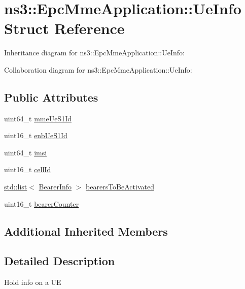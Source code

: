 \hypertarget{structns3_1_1EpcMmeApplication_1_1UeInfo}{}\section{ns3\+:\+:Epc\+Mme\+Application\+:\+:Ue\+Info Struct Reference}
\label{structns3_1_1EpcMmeApplication_1_1UeInfo}


Inheritance diagram for ns3\+:\+:Epc\+Mme\+Application\+:\+:Ue\+Info\+:


Collaboration diagram for ns3\+:\+:Epc\+Mme\+Application\+:\+:Ue\+Info\+:
\subsection*{Public Attributes}
\begin{DoxyCompactItemize}
\item 
uint64\+\_\+t \hyperlink{structns3_1_1EpcMmeApplication_1_1UeInfo_a310f7a7e997ea6dc59ec6cd8b8f434ab}{mme\+Ue\+S1\+Id}
\item 
uint16\+\_\+t \hyperlink{structns3_1_1EpcMmeApplication_1_1UeInfo_acfa8ea117a3926934775612d5f98ec86}{enb\+Ue\+S1\+Id}
\item 
uint64\+\_\+t \hyperlink{structns3_1_1EpcMmeApplication_1_1UeInfo_a116e788e899bbbbaf8fa761e45a02046}{imsi}
\item 
uint16\+\_\+t \hyperlink{structns3_1_1EpcMmeApplication_1_1UeInfo_af4d0e13fd4abc8a4bc8cda5f87c45c7d}{cell\+Id}
\item 
\hyperlink{openflow-interface_8h_afd9bcfa176617760671b67580f536fa7}{std\+::list}$<$ \hyperlink{structns3_1_1EpcMmeApplication_1_1BearerInfo}{Bearer\+Info} $>$ \hyperlink{structns3_1_1EpcMmeApplication_1_1UeInfo_a75167c9a7c160bc3ea4fb18020573e66}{bearers\+To\+Be\+Activated}
\item 
uint16\+\_\+t \hyperlink{structns3_1_1EpcMmeApplication_1_1UeInfo_a047281e9e591f1524aab9af57fa2eed1}{bearer\+Counter}
\end{DoxyCompactItemize}
\subsection*{Additional Inherited Members}


\subsection{Detailed Description}
Hold info on a UE 

